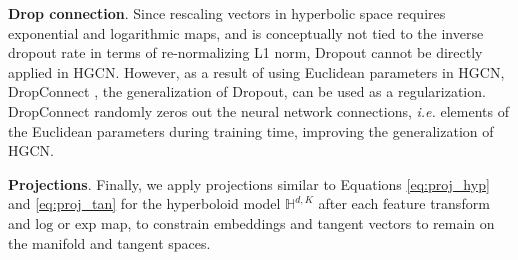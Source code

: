 \documentclass{article}
\newcommand{\xhdr}[1]{{\noindent\bfseries #1}.}
\newcommand{\name}{\textsc{HGCN}\xspace}
\newcommand{\cut}[1]{}
\begin{document}
\xhdr{Drop connection}
Since rescaling vectors in hyperbolic space requires exponential and logarithmic maps, and is conceptually not tied to the inverse dropout rate in terms of re-normalizing L1 norm, Dropout cannot be directly applied in \name.
However, as a result of using Euclidean parameters in \name, DropConnect \cite{wan2013regularization}, the generalization of Dropout, can be used as a regularization. DropConnect randomly zeros out the neural network connections, \emph{i.e.} elements of the Euclidean parameters during training time, improving the generalization of \name.



\xhdr{Projections}
Finally, we apply projections similar to Equations \ref{eq:proj_hyp} and \ref{eq:proj_tan} for the hyperboloid model $\mathbb{H}^{d,K}$ after each feature transform and $\mathrm{log}$ or $\mathrm{exp}$ map, to constrain embeddings and tangent vectors to remain on the manifold and tangent spaces.

\cut{Trainable curvature also provides a way to skip otherwise bad local minima in optimization.
In Figure \ref{fig:sweep_c} we observe that the curve of performance against curvature has fluctuations, despite theoretically equivalent local minima, suggesting that suboptimal local minima are reached for some curvatures. 
Training the curvature jointly with \name allows effective escape of local minima during optimization.
\subsection{Visualization}
\begin{figure}[t]
    \centering
    \begin{subfigure}[b]{0.24\textwidth}
        \texttt{[image: figs/HGCN\_attention\_1.png]}
        \label{fig:hgcn_att_1}
    \end{subfigure}
    \begin{subfigure}[b]{0.24\textwidth}
        \texttt{[image: figs/GAT\_attention\_1.png]}
        \label{fig:hgcn_att_2}
    \end{subfigure}
    \begin{subfigure}[b]{0.24\textwidth}
        \texttt{[image: figs/HGCN\_attention\_2.png]}
        \label{fig:gat_att_1}
    \end{subfigure}
    \begin{subfigure}[b]{0.24\textwidth}
        \texttt{[image: figs/GAT\_attention\_2.png]}
    \label{fig:gat_att_2}
    \end{subfigure}
    \caption{Each graph represents a 2-hop neighborhood of the \textbf{\textsc{Disease-M.}} dataset. The red node is the node where we compute attention for. The darkness of the color for other nodes denote their hierarchy. The attention weights for nodes in neighborhood with respect to the red node are visualized by the intensity of edges, and the ligher the edge is, the less attention weight. .}
    \label{fig:att_weights_appendix}
\end{figure}
} 


\end{document}
